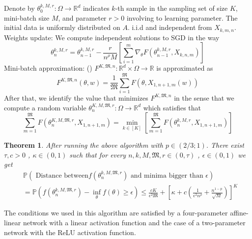 \documentclass{article}
\theoremstyle{theorem}
\newtheorem{theorem}{Theorem}
\theoremstyle{definition}
\begin{document}
Denote by $\theta_{0}^{k,M,r} : \Omega \to \mathbb{R}^d$ indicates $k$-th sample in the sampling set of size $K$, mini-batch size $M$, and parameter $r>0$ involving to learning parameter. The initial data is uniformly distributed on $A$. i.i.d and independent from $X_{k,m,n}$.\\
Weights update: We compute independent solutions to SGD in the way $$\theta_{n}^{k,M,r}  =\theta_{n-1}^{k,M,r} -\frac{r}{n^{\rho} M} \left[\sum_{i=1}^{m} \nabla_{\theta}F(\theta_{n-1}^{k,M,r} , X_{k,n,m}) \right] $$
Mini-batch approximation: (\cite{ghadimi2013minibatch}) $F^{K, \mathfrak{M},n }: \mathbb{R}^d \times \Omega \to \mathbb{R}$ is approximated as
$$F^{K, \mathfrak{M},n }(\theta , w)= \frac{1}{\mathfrak{M}} \sum_{i=1}^{\mathfrak{M}}  F \left( \theta,  X_{1,n+1,m} (w)\right)$$
After that, we identify the value that minimizes $F^{K, \mathfrak{M},n }$ in the sense that we compute a random variable $\theta_{n}^{K,M,\mathfrak{M},r} : \Omega \to \mathbb{R}^d$ which satisfies that
$$\sum_{m=1}^{\mathfrak{M}}F \left(\theta_{n}^{K,M,\mathfrak{M},r} , X_{1,n+1,m}\right) =\min_{k \in [K]} \left[\sum_{m=1}^{\mathfrak{M}}F \left(\theta_{n}^{k,M,r} , X_{1,n+1,m}\right) \right]$$
\begin{theorem} \cite{fehrman2019convergence}After running the above algorithm with $p \in (2/3;1)$. There exist $\tau ,c >0$ , $\kappa \in (0,1)$ such that for every $n,k,M,\mathfrak{M},r \in (0 , \tau)$ , $\epsilon \in (0,1)$ we get
 $$\begin{aligned}
&\mathbb{P}\left( \text{ Distance between} f(\theta_{n}^{k,M,\mathfrak{M},r}) \text{ and minima bigger than }\epsilon \right) \\ &= \mathbb{P}\left(  f(\theta_{n}^{k,M,\mathfrak{M},r}) - \inf_{\theta} f(\theta)\geq \epsilon \right) \leq \frac{cK}{\epsilon^2 \mathfrak{M}} + \left[ \kappa + c \left(\frac{1}{\epsilon^2 n ^{\rho}}+ \frac{n^{1-p}}{\sqrt{M}}\right)\right]^K \end{aligned}$$
\end{theorem}
The conditions we used in this algorithm are satisfied by a four-parameter affine-linear network with a linear activation function and the case of a two-parameter network with the ReLU activation function. \cite{fehrman2019convergence}
\end{document}
